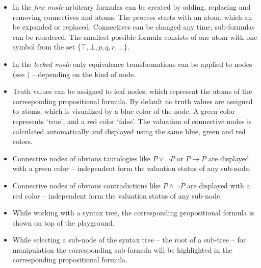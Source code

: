 \begin{itemize}

\item In the {\em free mode} arbitrary formulas can be created by adding, replacing and removing connectives and atoms. The process starts with an atom, which an be expanded or replaced. 
Connectives can be changed any time, sub-formulas can be reordered.
The smallest possible formula consists of one atom with one symbol from the set $\{ \top, \bot, p, q, r, … \}$.

\item In the {\em locked mode} only equivalence transformations can be applied to nodes (see )
– depending on the kind of node. 

\item Truth values can be assigned to leaf nodes, 
which represent the atoms of the corresponding propositional formula. 
By default no truth values are assigned to atoms, which is visualized by a blue color of the node.
A green color represents ‘true’, and a red color ‘false’.
The valuation of connective nodes is calculated automatically 
and displayed using the same blue, green and red colors.

\item Connective nodes of obvious tautologies like
$P \vee \neg P$ or
$P \rightarrow P$ are displayed with a green color – 
independent form the valuation status of any sub-node.

\item Connective nodes of obvious contradictions like $P \wedge \neg P$ are displayed with a red color – 
independent form the valuation status of any sub-node.

\item While working with a syntax tree, the corresponding propositional formula is shown on top of the playground.

\item While selecting a sub-node of the syntax tree – the root of a sub-tree – 
for manipulation the corresponding sub-formula will be highlighted in the corresponding propositional formula.

\end{itemize}


